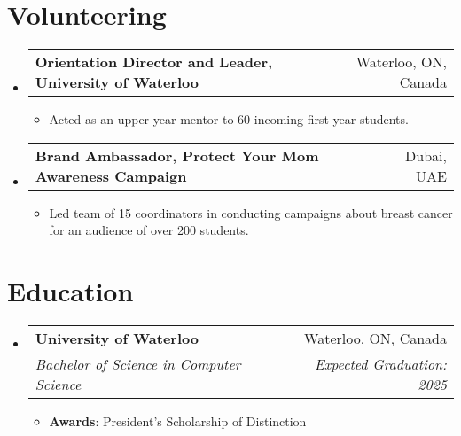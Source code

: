 \documentclass[letterpaper,11pt]{article}
\makeatletter
\newcommand{\resumeItem}[1]{
  \item\small{
    {#1 \vspace{-2pt}}
  }
}
\newcommand{\resumeSubheading}[4]{
  \vspace{-2pt}\item
    \begin{tabular*}{0.97\textwidth}[t]{l@{\extracolsep{\fill}}r}
      \textbf{#1} & #2 \\
      \textit{\small#3} & \textit{\small #4} \\
    \end{tabular*}\vspace{-7pt}
}
\newcommand{\resumeProjectHeading}[2]{
    \item
    \begin{tabular*}{0.97\textwidth}{l@{\extracolsep{\fill}}r}
      \small#1 & #2 \\
    \end{tabular*}\vspace{-7pt}
}
\newcommand{\resumeSubHeadingListStart}{\begin{itemize}[leftmargin=0.15in, label={}]}
\newcommand{\resumeSubHeadingListEnd}{\end{itemize}}
\newcommand{\resumeItemListStart}{\begin{itemize}}
\newcommand{\resumeItemListEnd}{\end{itemize}\vspace{-5pt}}
\makeatother
\begin{document}
\section{Volunteering}
  \resumeSubHeadingListStart
    \resumeProjectHeading
      {\textbf {Orientation Director and Leader, University of Waterloo}}{Waterloo, ON, Canada}
      \resumeItemListStart
            \resumeItem{Acted as an upper-year mentor to 60 incoming first year students.}
          \resumeItemListEnd
    \resumeProjectHeading
      {\textbf {Brand Ambassador, Protect Your Mom Awareness Campaign}}{Dubai, UAE}
      \resumeItemListStart
            \resumeItem{Led team of 15 coordinators in conducting campaigns about breast cancer for an audience of over 200 students.}
          \resumeItemListEnd
  \resumeSubHeadingListEnd


\section{Education}
  \resumeSubHeadingListStart
    \resumeSubheading
      {University of Waterloo}{Waterloo, ON, Canada}
      {Bachelor of Science in Computer Science}{Expected Graduation: 2025}
      \resumeItemListStart
            \resumeItem{\textbf {Awards}: President’s Scholarship of Distinction}
          \resumeItemListEnd
  \resumeSubHeadingListEnd


\end{document}

